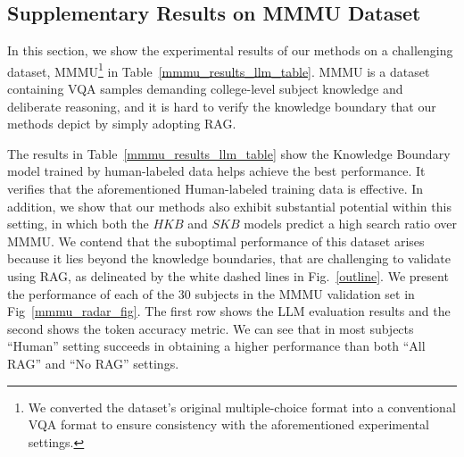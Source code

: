\subsection{Supplementary Results on MMMU Dataset}
\label{mmmu_appendix_section}

In this section, we show the experimental results of our methods on a challenging dataset, MMMU\footnote{We converted the dataset's original multiple-choice format into a conventional VQA format to ensure consistency with the aforementioned experimental settings.} \cite{yue2023mmmu} in Table~\ref{mmmu_results_llm_table}. MMMU is a dataset containing VQA samples demanding college-level subject knowledge and deliberate reasoning, and it is hard to verify the knowledge boundary that our methods depict by simply adopting RAG.  

The results in Table~\ref{mmmu_results_llm_table} show the Knowledge Boundary model trained by human-labeled data helps achieve the best performance. It verifies that the aforementioned Human-labeled training data is effective. In addition, we show that our methods also exhibit substantial potential within this setting, in which both the $HKB$ and $SKB$ models predict a high search ratio over MMMU. We contend that the suboptimal performance of this dataset arises because it lies beyond the knowledge boundaries, that are challenging to validate using RAG, as delineated by the white dashed lines in Fig.~\ref{outline}. We present the performance of each of the 30 subjects in the MMMU validation set in Fig~\ref{mmmu_radar_fig}. The first row shows the LLM evaluation results and the second shows the token accuracy metric. We can see that in most subjects ``Human'' setting succeeds in obtaining a higher performance than both ``All RAG'' and ``No RAG'' settings. 


\begin{table*}
\centering
{}
\caption{Results evaluated by LLM on MMMU validation set.}
\label{mmmu_results_llm_table}
\end{table*}


